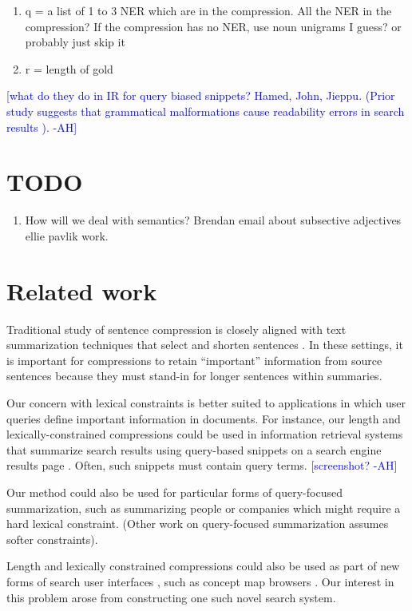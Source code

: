 \documentclass[11pt,a4paper]{article}
\newcommand{\ahcomment}[1]{\textcolor{blue}{[#1 -AH]}}
\begin{document}
\begin{enumerate}
\item{q = a list of 1 to 3 NER which are in the compression. All the NER in the compression? If the compression has no NER, use noun unigrams I guess? or probably just skip it}
\item{r = length of gold}
\end{enumerate}

\ahcomment{what do they do in IR for query biased snippets? Hamed, John, Jieppu.
 (Prior study suggests that grammatical malformations cause readability errors in search results \cite{kanungo2009predicting}).}

\section{TODO}
\begin{enumerate}
\item{How will we deal with semantics? Brendan email about subsective adjectives ellie pavlik work. }
\end{enumerate}

\section{Related work}

Traditional study of sentence compression is closely aligned with text summarization techniques that select and  shorten sentences \cite{Knight2000StatisticsBasedS,vanderwende2007beyond,clarke2008global,Nenkova2012ASO}. 
In these settings, it is important for compressions to retain ``important'' information from source sentences because they must stand-in for longer sentences within summaries.

Our concern with lexical constraints is better suited to applications in which user queries define important information in documents. For instance, our length and lexically-constrained compressions could be used in information retrieval systems that summarize search results using query-based snippets on a search engine results page \cite{tombros1998advantages,Metzler2008MachineLS}. Often, such snippets must contain query terms. \ahcomment{screenshot?}

Our method could also be used for particular forms of query-focused summarization, such as summarizing people \cite{w04} or companies \cite{filippova2009company} which might require a hard lexical constraint. (Other work on query-focused summarization \cite{das} assumes softer constraints). 

Length and lexically constrained compressions could also be used as part of new forms of search user interfaces \cite{hearst2009search}, such as concept map browsers \cite{falke2017graphdocexplore}. Our interest in this problem arose from constructing one such novel search system.



\end{document}
